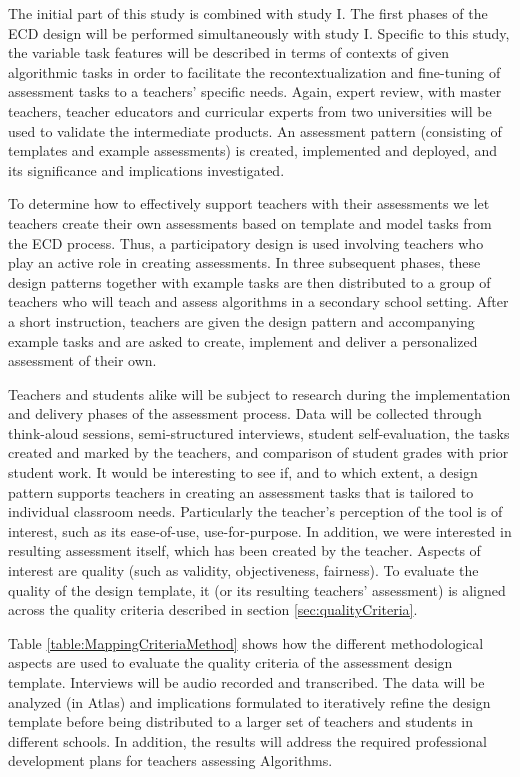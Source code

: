 The initial part of this study is combined with study I. The first phases of the ECD design will be performed simultaneously with study I.  Specific to this study, the variable task features will be described in terms of contexts of given algorithmic tasks in order to facilitate the recontextualization and fine-tuning of assessment tasks to a teachers' specific needs. Again, expert review, with master teachers, teacher educators and curricular experts from two universities will be used to validate the intermediate products. An assessment pattern (consisting of templates and example assessments) is created, implemented and deployed, and its significance and implications investigated.


To determine how to effectively support teachers with their assessments we let teachers create their own assessments based on template and model tasks from the ECD process. Thus, a participatory design is used involving teachers who play an active role in creating assessments. In three subsequent phases, these design patterns together with example tasks are then distributed to a group of teachers who will teach and assess algorithms in a secondary school setting. After a short instruction, teachers are given the design pattern and accompanying example tasks and are asked to create, implement and deliver a personalized assessment of their own.


Teachers and students alike will be subject to research during the implementation and delivery phases of the assessment process. Data will be collected through think-aloud sessions, semi-structured interviews, student self-evaluation, the tasks created and marked by the teachers, and comparison of student grades with prior student work. It would be interesting to see if, and to which extent, a design pattern supports teachers in creating an assessment tasks that is tailored to individual classroom needs. Particularly the teacher’s perception of the tool is of interest, such as its ease-of-use, use-for-purpose. In addition, we were interested in resulting assessment itself, which has been created by the teacher. Aspects of interest are quality (such as validity, objectiveness, fairness). To evaluate the quality of the design template, it (or its resulting teachers' assessment) is aligned across the quality criteria described in section \ref{sec:qualityCriteria}.




Table \ref{table:MappingCriteriaMethod} shows how the different methodological aspects are used to evaluate the quality criteria of the assessment design template. Interviews will be audio recorded and transcribed. The data will be analyzed (in Atlas) and implications formulated to iteratively refine the design template before being distributed to a larger set of teachers and students in different schools.  In addition, the results will address the required professional development plans for teachers assessing Algorithms.

